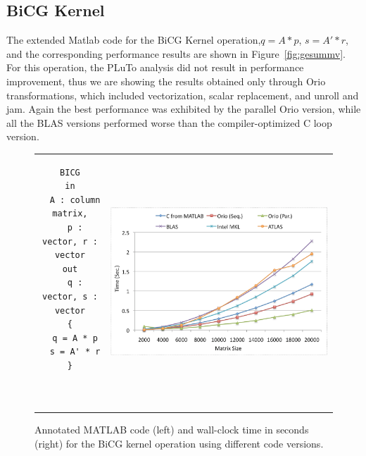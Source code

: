 \documentclass[runningheads]{llncs}
\begin{document}
\subsection{BiCG Kernel}

The extended Matlab code for the BiCG Kernel operation,$q = A * p$, $s = A' * r$,
and the corresponding performance results are shown in Figure~\ref{fig:gesummv}. For this operation, the PLuTo analysis did not result in performance improvement, thus we are showing the results obtained only through Orio transformations, which included vectorization, scalar replacement, and unroll and jam. Again the best performance was exhibited by the parallel Orio version, while all the BLAS versions performed worse than the compiler-optimized C loop version.


\begin{figure}[htp]
\centering
\begin{tabular}{cc}
\begin{minipage}[b]{.3\textwidth}
\footnotesize
\begin{verbatim}
BICG
in
  A : column matrix,
  p : vector, r : vector
out
  q : vector, s : vector
{
  q = A * p
  s = A' * r
}



\end{verbatim}
\end{minipage}
&
\begin{minipage}[b]{.6\textwidth}
\includegraphics[width=\textwidth]{figures/bicgkernel.eps}
\end{minipage}\\
\end{tabular}
\caption{Annotated MATLAB code (left) and wall-clock time in seconds (right) for the BiCG kernel operation using different code versions.}
\label{fig:bicgkernel}
\end{figure}
\end{document}
